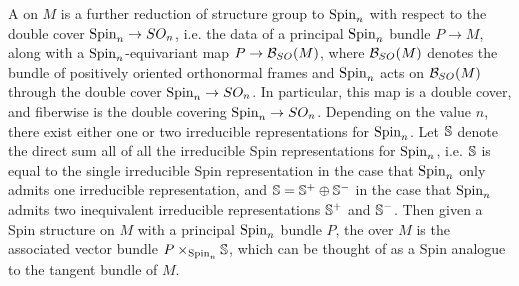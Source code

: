 A  on $M$ is a further reduction of structure group to
$\Spin_n$ with respect to the double cover $\Spin_n \to SO_n$, i.e. the data of
a principal $\Spin_n$ bundle $P \to M$, along with a $\Spin_n$-equivariant map
$P \to \B_{SO}(M)$, where $\B_{SO}(M)$ denotes the bundle of positively oriented
orthonormal frames
and $\Spin_n$ acts on $\B_{SO}(M)$ through the double cover $\Spin_n \to SO_n$. In
particular, this map is a double cover, and fiberwise is the double covering
$\Spin_n \to SO_n$.
Depending on the value $n$, there exist either one or two irreducible representations
for $\Spin_n$. Let $\S$ denote the direct sum all of all the irreducible
Spin representations
for $\Spin_n$, i.e. $\S$ is equal to the single irreducible Spin representation in the
case that $\Spin_n$ only admits one irreducible representation, and
$\S = \S^+ \oplus \S^-$
in the case that $\Spin_n$ admits two inequivalent irreducible representations $\S^+$
and $\S^-$. Then given a Spin structure on $M$ with a principal $\Spin_n$ bundle
$P$, the  over $M$ is the associated vector bundle
$P \times_{\Spin_n} \S$, which can be thought of as a Spin analogue to
the tangent bundle of $M$.
%

